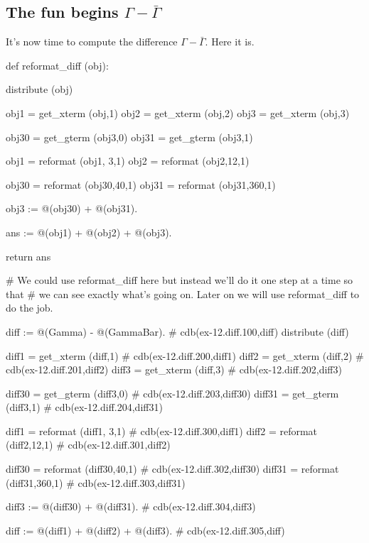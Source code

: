 \documentclass[12pt]{cdblatex}
\begin{document}
\clearpage

\def\GammaBar{{\bar{\Gamma}}}

\subsection*{The fun begins $\Gamma - \GammaBar$}

It's now time to compute the difference $\Gamma-\GammaBar$. Here it is.

\begin{cadabra}
   def reformat_diff (obj):

       distribute (obj)

       obj1  = get_xterm (obj,1)
       obj2  = get_xterm (obj,2)
       obj3  = get_xterm (obj,3)

       obj30 = get_gterm (obj3,0)
       obj31 = get_gterm (obj3,1)

       obj1  = reformat (obj1, 3,1)
       obj2  = reformat (obj2,12,1)

       obj30 = reformat (obj30,40,1)
       obj31 = reformat (obj31,360,1)

       obj3 := @(obj30) + @(obj31).

       ans := @(obj1) + @(obj2) + @(obj3).

       return ans

   # We could use reformat_diff here but instead we'll do it one step at a time so that
   # we can see exactly what's going on. Later on we will use reformat_diff to do the job.

   diff := @(Gamma) - @(GammaBar).                                # cdb(ex-12.diff.100,diff)
   distribute (diff)

   diff1  = get_xterm (diff,1)                                    # cdb(ex-12.diff.200,diff1)
   diff2  = get_xterm (diff,2)                                    # cdb(ex-12.diff.201,diff2)
   diff3  = get_xterm (diff,3)                                    # cdb(ex-12.diff.202,diff3)

   diff30 = get_gterm (diff3,0)                                   # cdb(ex-12.diff.203,diff30)
   diff31 = get_gterm (diff3,1)                                   # cdb(ex-12.diff.204,diff31)

   diff1  = reformat (diff1, 3,1)                                 # cdb(ex-12.diff.300,diff1)
   diff2  = reformat (diff2,12,1)                                 # cdb(ex-12.diff.301,diff2)

   diff30 = reformat (diff30,40,1)                                # cdb(ex-12.diff.302,diff30)
   diff31 = reformat (diff31,360,1)                               # cdb(ex-12.diff.303,diff31)

   diff3 := @(diff30) + @(diff31).                                # cdb(ex-12.diff.304,diff3)

   diff := @(diff1) + @(diff2) + @(diff3).                        # cdb(ex-12.diff.305,diff)

\end{cadabra}
\end{document}
